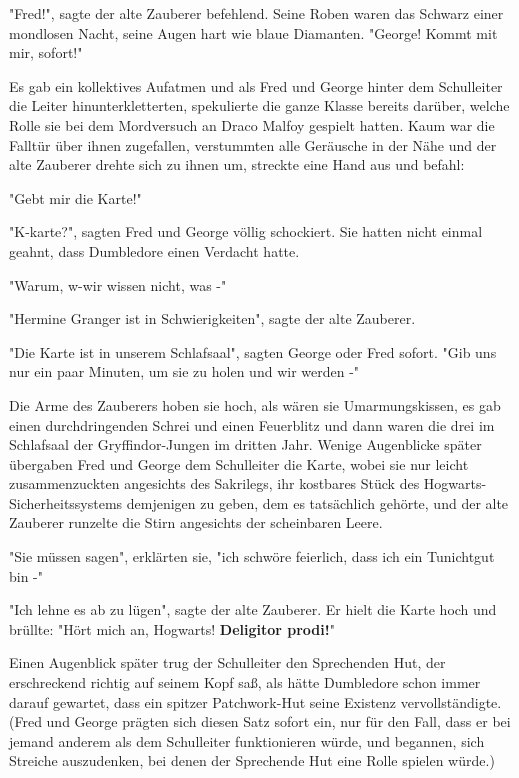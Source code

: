 {"Fred!", sagte der alte Zauberer befehlend. Seine Roben waren das Schwarz einer mondlosen Nacht, seine Augen hart wie blaue Diamanten. "George! Kommt mit mir, sofort!"

Es gab ein kollektives Aufatmen und als Fred und George hinter dem Schulleiter die Leiter hinunterkletterten, spekulierte die ganze Klasse bereits darüber, welche Rolle sie bei dem Mordversuch an Draco Malfoy gespielt hatten. Kaum war die Falltür über ihnen zugefallen, verstummten alle Geräusche in der Nähe und der alte Zauberer drehte sich zu ihnen um, streckte eine Hand aus und befahl:

"Gebt mir die Karte!"

"K-karte?", sagten Fred und George völlig schockiert. Sie hatten nicht einmal geahnt, dass Dumbledore einen Verdacht hatte.

"Warum, w-wir wissen nicht, was -"

"Hermine Granger ist in Schwierigkeiten", sagte der alte Zauberer.

"Die Karte ist in unserem Schlafsaal", sagten George oder Fred sofort. "Gib uns nur ein paar Minuten, um sie zu holen und wir werden -"

Die Arme des Zauberers hoben sie hoch, als wären sie Umarmungskissen, es gab einen durchdringenden Schrei und einen Feuerblitz und dann waren die drei im Schlafsaal der Gryffindor-Jungen im dritten Jahr. Wenige Augenblicke später übergaben Fred und George dem Schulleiter die Karte, wobei sie nur leicht zusammenzuckten angesichts des Sakrilegs, ihr kostbares Stück des Hogwarts-Sicherheitssystems demjenigen zu geben, dem es tatsächlich gehörte, und der alte Zauberer runzelte die Stirn angesichts der scheinbaren Leere.

"Sie müssen sagen", erklärten sie, "ich schwöre feierlich, dass ich ein Tunichtgut bin -"

"Ich lehne es ab zu lügen", sagte der alte Zauberer. Er hielt die Karte hoch und brüllte: "Hört mich an, Hogwarts! \textbf{Deligitor prodi!}"

Einen Augenblick später trug der Schulleiter den Sprechenden Hut, der erschreckend richtig auf seinem Kopf saß, als hätte Dumbledore schon immer darauf gewartet, dass ein spitzer Patchwork-Hut seine Existenz vervollständigte. (Fred und George prägten sich diesen Satz sofort ein, nur für den Fall, dass er bei jemand anderem als dem Schulleiter funktionieren würde, und begannen, sich Streiche auszudenken, bei denen der Sprechende Hut eine Rolle spielen würde.)

}

